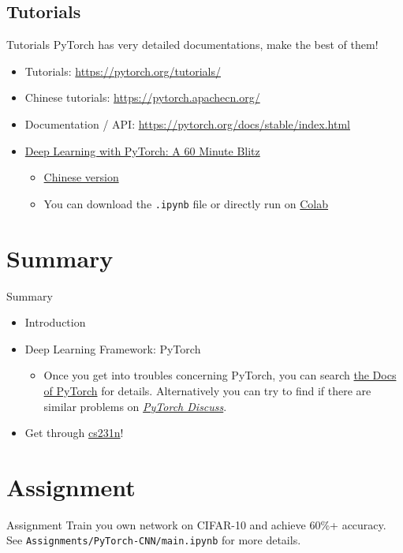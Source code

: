 \documentclass{../TexTemplate/myslide}
\begin{document}
\subsection{Tutorials}
\begin{frame}[fragile]{Tutorials}
PyTorch has very detailed documentations, make the best of them!
\begin{itemize}
	\item Tutorials: \url{https://pytorch.org/tutorials/}
	\item Chinese tutorials: \url{https://pytorch.apachecn.org/}
	\item Documentation / API: \url{https://pytorch.org/docs/stable/index.html}
	\item \href{https://pytorch.org/tutorials/beginner/deep_learning_60min_blitz.html}{Deep Learning with PyTorch: A 60 Minute Blitz}
	\begin{itemize}
		\item \href{https://pytorch.apachecn.org/docs/1.0/deep_learning_60min_blitz.html}{Chinese version}
		\item You can download the \verb'.ipynb' file or directly run on \href{https://colab.research.google.com/}{Colab}
	\end{itemize}
\end{itemize}
\end{frame}

\section{Summary}
\begin{frame}
\sectionpage
\end{frame}

\begin{frame}{Summary}
\begin{itemize}
	\item Introduction
	\item Deep Learning Framework: PyTorch
	\begin{itemize}
		\item Once you get into troubles concerning PyTorch, you can search \href{http://pytorch.org/docs/master/index.html}{the Docs of PyTorch} for details. Alternatively you can try to find if there are similar problems on \href{https://discuss.pytorch.org/}{\emph{PyTorch Discuss}}.
	\end{itemize}
	\item Get through \href{http://cs231n.github.io/}{cs231n}!
\end{itemize}
\end{frame}

\section{Assignment}
\begin{frame}[fragile]{Assignment}
Train you own network on CIFAR-10 and achieve 60\%+ accuracy.
\quad\\\bigskip
See \verb'Assignments/PyTorch-CNN/main.ipynb' for more details.
\end{frame}
\end{document}

